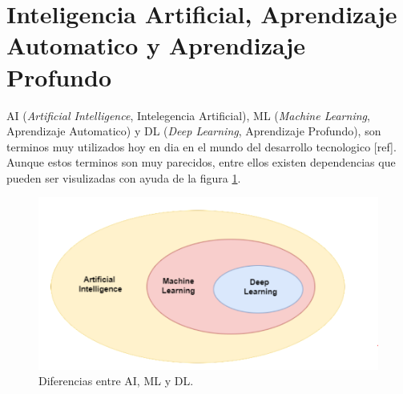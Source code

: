 \section{Inteligencia Artificial, Aprendizaje Automatico y Aprendizaje Profundo}

AI (\textit{Artificial Intelligence}, Intelegencia Artificial), ML (\textit{Machine Learning}, Aprendizaje Automatico) y DL (\textit{Deep Learning}, Aprendizaje Profundo), son terminos muy utilizados hoy en dia en el mundo del desarrollo tecnologico [ref]. Aunque estos terminos son muy parecidos, entre ellos existen dependencias que pueden ser visulizadas con ayuda de la figura \ref{fig:ai_ml_dl}.

\begin{figure}[h]
	\centering
	\includegraphics[scale=0.3]{./Figures/ai_ml_dl.png}
	\caption{Diferencias entre AI, ML y DL.}
	\label{fig:ai_ml_dl}
\end{figure}

